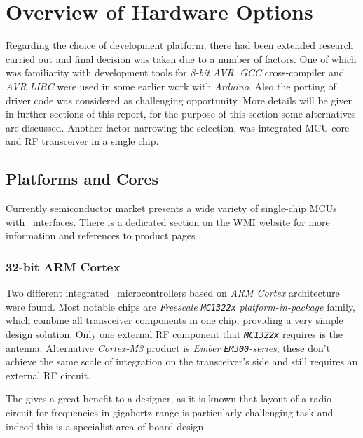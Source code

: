 

\section{Overview of Hardware Options}

  Regarding the choice of development platform, there had been extended research
  carried out and final decision was taken due to a number of factors. One of
  which was familiarity with development tools for \emph{8-bit AVR}. \emph{GCC}
  cross-compiler and \emph{AVR LIBC} were used in some earlier work with
  \emph{Arduino}. Also the porting of driver code was considered as challenging
  opportunity. More details will be given in further sections of this report,
  for the purpose of this section some alternatives are discussed.  Another
  factor narrowing the selection, was integrated MCU core and RF transceiver
  in a single chip.

\subsection{Platforms and Cores}

 Currently semiconductor market presents a wide variety
 of single-chip MCUs with \WPAN\ interfaces. There is a
 dedicated section on the WMI website for more information
 and references to product pages \cite{wmi:wiki:chips1, wmi:wiki:chips2}.

\subsubsection{32-bit ARM Cortex}

 Two different integrated \WPAN\ microcontrollers based
 on \emph{ARM Cortex} architecture were found. Most notable
 chips are \emph{Freescale \texttt{MC1322x}}
 \emph{platform-in-package} family, which combine all transceiver
 components in one chip, providing a very simple design solution.
 Only one external RF component that \emph{\texttt{MC1322x}}
 requires is the antenna. Alternative \emph{Cortex-M3} product is
 \emph{Ember \texttt{EM300}-series}, these don't achieve the same
 scale of integration on the transceiver's side and still requires
 an external RF circuit.

 The  gives a great benefit to a designer, as it
 is known that layout of a radio circuit for frequencies in
 gigahertz range is particularly challenging task and indeed
 this is a specialist area of board design.

